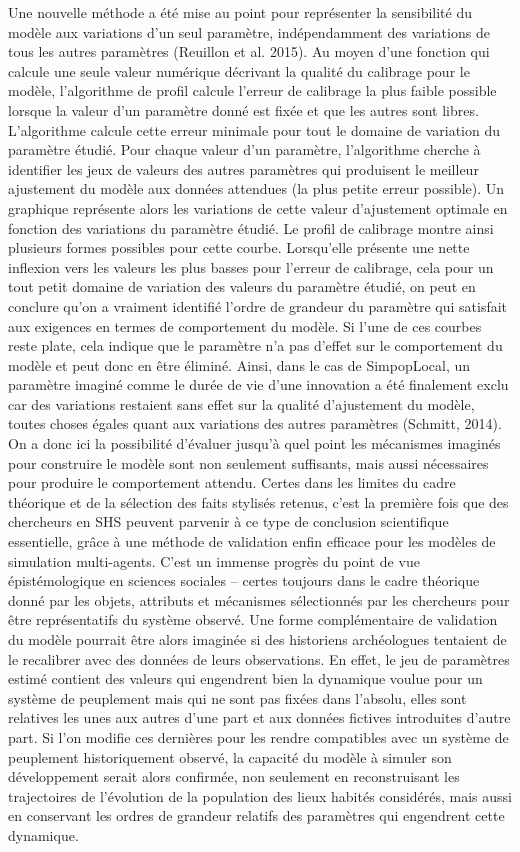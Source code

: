 \documentclass[10pt]{article}
\begin{document}
Une nouvelle méthode a été mise au point pour représenter la sensibilité du modèle aux variations d'un seul paramètre, indépendamment des variations de tous les autres paramètres (Reuillon et al. 2015). Au moyen d’une fonction qui calcule une seule valeur numérique décrivant la qualité du calibrage pour le modèle, l’algorithme de profil calcule l’erreur de calibrage la plus faible possible lorsque la valeur d'un paramètre donné est fixée et que les autres sont libres. L’algorithme calcule cette erreur minimale pour tout le domaine de variation du paramètre étudié. Pour chaque valeur d’un paramètre, l’algorithme cherche à identifier les jeux de valeurs des autres paramètres qui produisent le meilleur ajustement du modèle aux données attendues (la plus petite erreur possible). Un graphique représente alors les variations de cette valeur d’ajustement optimale en fonction des variations du paramètre étudié. Le profil de calibrage montre ainsi plusieurs formes possibles pour cette courbe. Lorsqu’elle présente une nette inflexion vers les valeurs les plus basses pour l’erreur de calibrage, cela pour un tout petit domaine de variation des valeurs du paramètre étudié, on peut en conclure qu’on a vraiment identifié l’ordre de grandeur du paramètre qui satisfait aux exigences en termes de comportement du modèle. Si l’une de ces courbes reste plate, cela indique que le paramètre n’a pas d’effet sur le comportement du modèle et peut donc en être éliminé. Ainsi, dans le cas de SimpopLocal, un paramètre imaginé comme le durée de vie d’une innovation a été finalement exclu car des variations restaient sans effet sur la qualité d’ajustement du modèle, toutes choses égales quant aux variations des autres paramètres (Schmitt, 2014). On a donc ici la possibilité d’évaluer jusqu’à quel point les mécanismes imaginés pour construire le modèle sont non seulement suffisants, mais aussi nécessaires pour produire le comportement attendu. Certes dans les limites du cadre théorique et de la sélection des faits stylisés retenus, c’est la première fois que des chercheurs en SHS peuvent parvenir à ce type de conclusion scientifique essentielle, grâce à une méthode de validation enfin efficace pour les modèles de simulation multi-agents. C’est un immense progrès du point de vue épistémologique en sciences sociales – certes toujours dans le cadre théorique donné par les objets, attributs et mécanismes sélectionnés par les chercheurs pour être représentatifs du système observé.
Une forme complémentaire de validation du modèle pourrait être alors imaginée si des historiens archéologues tentaient de le recalibrer avec des données de leurs observations. En effet, le jeu de paramètres estimé contient des valeurs qui engendrent bien la dynamique voulue pour un système de peuplement mais qui ne sont pas fixées dans l’absolu, elles sont  relatives les unes aux autres d’une part et aux données fictives introduites d’autre part. Si l’on modifie ces dernières pour les rendre compatibles avec un système de peuplement historiquement observé, la capacité du modèle à simuler son développement serait alors confirmée, non seulement en reconstruisant les trajectoires de l’évolution de la population des lieux habités considérés, mais aussi en conservant les ordres de grandeur relatifs des paramètres qui engendrent cette dynamique. 
\end{document}

